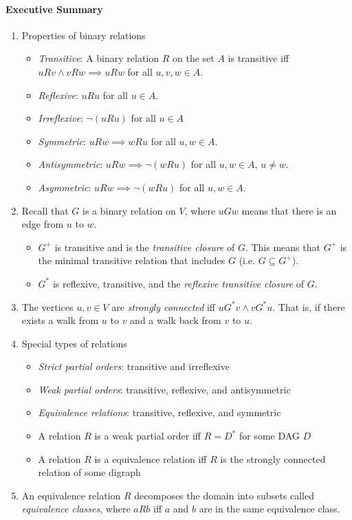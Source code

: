 \documentclass[12pt]{article}
\begin{document}
\paragraph*{Executive Summary}
\begin{enumerate}
\item Properties of binary relations
\begin{itemize}
\item \textit{Transitive}: A binary relation $R$ on the set $A$ is transitive iff\\$u R v \wedge v R w \implies u R w$ for all $u,v,w \in A$.
\item \textit{Reflexive}: $u R u$ for all $u \in A$.
\item \textit{Irreflexive}: $\neg(uRu)$ for all $u \in A$
\item \textit{Symmetric}: $u R w \implies w R u$ for all $u,w \in A$.
\item \textit{Antisymmetric}: $u R w \implies \neg(wRu)$ for all $u, w \in A$, $u \neq w$.
\item \textit{Asymmetric}: $u R w \implies \neg(wRu)$ for all $u, w \in A$.
\end{itemize}
\item Recall that $G$ is a binary relation on $V$, where $uGw$ means that there is an edge from $u$ to $w$.
\begin{itemize}
\item $G^+$ is transitive and is the \textit{transitive closure} of $G$. This means that $G^+$ is the minimal transitive relation that includes $G$ (i.e. $G \subseteq G^+$).
\item $G^*$ is reflexive, transitive, and the \textit{reflexive transitive closure} of $G$.
\end{itemize}
\item The vertices $u,v \in V$ are \textit{strongly connected} iff $uG^*v \wedge vG^*u$. That is, if there exists a walk from $u$ to $v$ and a walk back from $v$ to $u$.
\item Special types of relations
\begin{itemize}
\item \textit{Strict partial orders}: transitive and irreflexive
\item \textit{Weak partial orders}: transitive, reflexive, and antisymmetric
\item \textit{Equivalence relations}: transitive, reflexive, and symmetric
\item A relation $R$ is a weak partial order iff $R = D^*$ for some DAG $D$
\item A relation $R$ is a equivalence relation iff $R$ is the strongly connected relation of some digraph
\end{itemize}
\item An equivalence relation $R$ decomposes the domain into subsets called \textit{equivalence classes}, where $aRb$ iff $a$ and $b$ are in the same equivalence class.
\end{enumerate}
\end{document}
